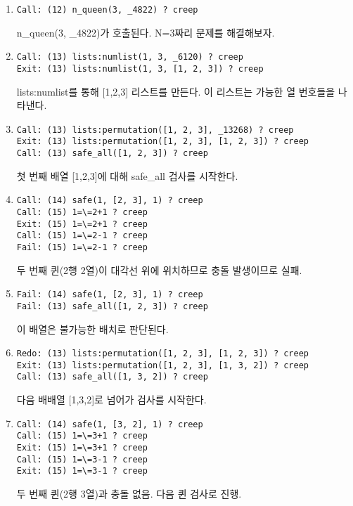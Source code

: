 \documentclass{article}
\begin{document}
\begin{enumerate}

\item
\begin{verbatim}
Call: (12) n_queen(3, _4822) ? creep
\end{verbatim}
n\_queen(3, \_4822)가 호출된다. N=3짜리 문제를 해결해보자.

\item
\begin{verbatim}
Call: (13) lists:numlist(1, 3, _6120) ? creep
Exit: (13) lists:numlist(1, 3, [1, 2, 3]) ? creep
\end{verbatim}
lists:numlist를 통해 [1,2,3] 리스트를 만든다. 이 리스트는 가능한 열 번호들을 나타낸다.

\item
\begin{verbatim}
Call: (13) lists:permutation([1, 2, 3], _13268) ? creep
Exit: (13) lists:permutation([1, 2, 3], [1, 2, 3]) ? creep
Call: (13) safe_all([1, 2, 3]) ? creep
\end{verbatim}
첫 번째 배열 [1,2,3]에 대해 safe\_all 검사를 시작한다.

\item
\begin{verbatim}
Call: (14) safe(1, [2, 3], 1) ? creep
Call: (15) 1=\=2+1 ? creep
Exit: (15) 1=\=2+1 ? creep
Call: (15) 1=\=2-1 ? creep
Fail: (15) 1=\=2-1 ? creep
\end{verbatim}
두 번째 퀸(2행 2열)이 대각선 위에 위치하므로 충돌 발생이므로 실패.

\item
\begin{verbatim}
Fail: (14) safe(1, [2, 3], 1) ? creep
Fail: (13) safe_all([1, 2, 3]) ? creep
\end{verbatim}
이 배열은 불가능한 배치로 판단된다.

\item
\begin{verbatim}
Redo: (13) lists:permutation([1, 2, 3], [1, 2, 3]) ? creep
Exit: (13) lists:permutation([1, 2, 3], [1, 3, 2]) ? creep
Call: (13) safe_all([1, 3, 2]) ? creep
\end{verbatim}
다음 배배열 [1,3,2]로 넘어가 검사를 시작한다.

\item
\begin{verbatim}
Call: (14) safe(1, [3, 2], 1) ? creep
Call: (15) 1=\=3+1 ? creep
Exit: (15) 1=\=3+1 ? creep
Call: (15) 1=\=3-1 ? creep
Exit: (15) 1=\=3-1 ? creep
\end{verbatim}
두 번째 퀸(2행 3열)과 충돌 없음. 다음 퀸 검사로 진행.


\end{enumerate}
\end{document}
